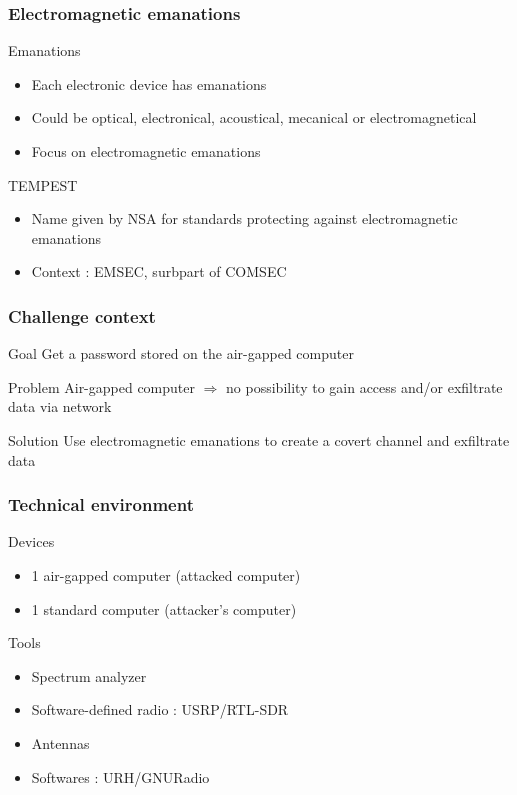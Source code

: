 \begin{frame}
\frametitle{Electromagnetic emanations}
\begin{block}{Emanations}
\begin{itemize}
\item Each electronic device has emanations
\item Could be optical, electronical, acoustical, mecanical or electromagnetical
\item Focus on electromagnetic emanations
\end{itemize}
\end{block}

\begin{block}{TEMPEST}
\begin{itemize}
\item Name given by NSA for standards protecting against electromagnetic emanations
\item Context : EMSEC, surbpart of COMSEC
\end{itemize}
\end{block}
\end{frame}

\begin{frame}
\frametitle{Challenge context}
\begin{block}{Goal}
Get a password stored on the air-gapped computer
\end{block}

\begin{alertblock}{Problem}
Air-gapped computer $\Longrightarrow$ no possibility to gain access and/or exfiltrate data via network
\end{alertblock}

\begin{exampleblock}{Solution}
Use electromagnetic emanations to create a covert channel and exfiltrate data
\end{exampleblock}

\end{frame}


\begin{frame}
\frametitle{Technical environment}
\begin{block}{Devices}
\begin{itemize}
\item 1 air-gapped computer (attacked computer)
\item 1 standard computer (attacker's computer)
\end{itemize}
\end{block}

\begin{block}{Tools}
\begin{itemize}
\item Spectrum analyzer
\item Software-defined radio : USRP/RTL-SDR
\item Antennas
\item Softwares : URH/GNURadio
\end{itemize}
\end{block}



\end{frame}
